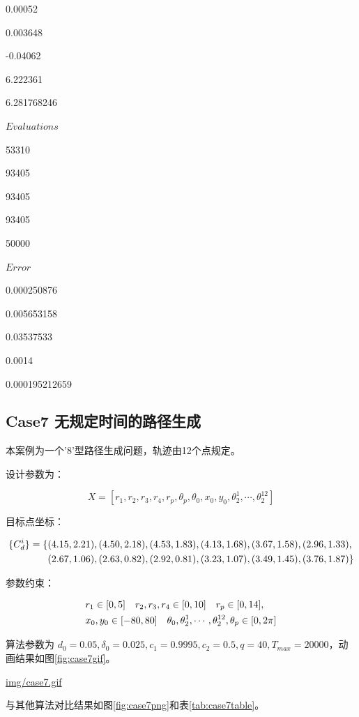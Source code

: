 \documentclass[]{ctexbook}
\theoremstyle{definition}
\theoremstyle{definition}
\theoremstyle{definition}
\theoremstyle{remark}
\begin{document}
0.00052

0.003648

-0.04062

6.222361

6.281768246

\(Evaluations\)

53310

93405

93405

93405

50000

\(Error\)

0.000250876

0.005653158

0.03537533

0.0014

0.000195212659

\subsection{Case7 无规定时间的路径生成}\label{case7-}

本案例为一个'8'型路径生成问题，轨迹由12个点规定。

设计参数为：

\[
X = [r_1,r_2,r_3,r_4,r_p,\theta_p,\theta_0,x_0,y_0,\theta_2^1,\cdots,\theta_2^{12}]
\]

目标点坐标：

\begin{align}
\{C_d^i\} = \{&(4.15,2.21),(4.50,2.18),(4.53,1.83),(4.13,1.68),(3.67,1.58),(2.96,1.33), \notag \\
&(2.67,1.06),(2.63,0.82),(2.92,0.81),(3.23,1.07),(3.49,1.45),(3.76,1.87)\}\notag\\
\end{align}

参数约束：

\begin{align}
&r_1\in[0,5]\quad r_2,r_3,r_4\in[0,10] \quad r_p\in[0,14],\notag \\
&x_0,y_0\in[-80,80]\quad \theta_0,\theta_2^1,\cdots,\theta_2^{12},\theta_p\in[0,2\pi] \notag \\
\end{align}

算法参数为
\(d_0 = 0.05,\delta_0=0.025,c_1=0.9995,c_2=0.5,q=40,T_{max}=20000\)，动画结果如图\ref{fig:case7gif}。

\url{img/case7.gif}

与其他算法对比结果如图\ref{fig:case7png}和表\ref{tab:case7table}。
\end{document}
